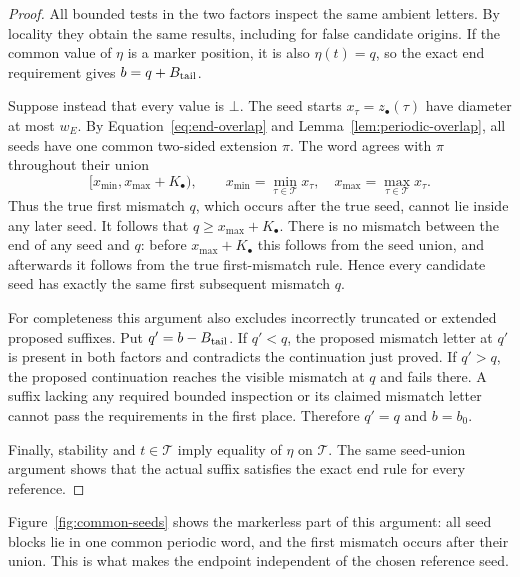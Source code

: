 \begin{proof}
All bounded tests in the two factors inspect the same ambient letters.
By locality they obtain the same results, including for false candidate
origins.  If the common value of $\eta$ is a marker position, it is also
$\eta(t)=q$, so the exact end requirement gives $b=q+B_{\rm tail}$.

Suppose instead that every value is $\bot$.  The seed starts
$x_\tau=z_\bullet(\tau)$ have diameter at most $w_E$.
By Equation~\eqref{eq:end-overlap} and
Lemma~\ref{lem:periodic-overlap}, all seeds have one common two-sided
extension $\pi$.  The word agrees with $\pi$ throughout their union
\[
 [x_{\min},x_{\max}+K_\bullet),
 \qquad
 x_{\min}=\min_{\tau\in\mathcal T}x_\tau,
 \quad x_{\max}=\max_{\tau\in\mathcal T}x_\tau.
\]
Thus the true first mismatch $q$, which occurs after the true seed,
cannot lie inside any later seed.  It follows that
$q\ge x_{\max}+K_\bullet$.  There is no mismatch between the end of any
seed and $q$: before $x_{\max}+K_\bullet$ this follows from the seed
union, and afterwards it follows from the true first-mismatch rule.
Hence every candidate seed has exactly the same first subsequent
mismatch $q$.

For completeness this argument also excludes incorrectly truncated or
extended proposed suffixes.  Put $q'=b-B_{\rm tail}$.  If $q'<q$, the
proposed mismatch letter at $q'$ is present in both factors and
contradicts the continuation just proved.  If $q'>q$, the proposed
continuation reaches the visible mismatch at $q$ and fails there.  A
suffix lacking any required bounded inspection or its claimed mismatch
letter cannot pass the requirements in the first place.  Therefore
$q'=q$ and $b=b_0$.

Finally, stability and $t\in\mathcal T$ imply equality of $\eta$ on
$\mathcal T$.  The same seed-union argument shows that the actual suffix
satisfies the exact end rule for every reference.
\end{proof}

Figure~\ref{fig:common-seeds} shows the markerless part of this argument:
all seed blocks lie in one common periodic word, and the first mismatch
occurs after their union. This is what makes the endpoint independent of
the chosen reference seed.

